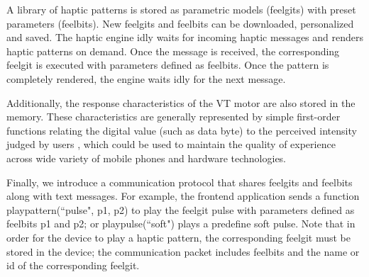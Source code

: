 A library of haptic patterns is stored as parametric models (feelgits) with preset parameters (feelbits). New feelgits and feelbits can be downloaded, personalized and saved. The haptic engine idly waits for incoming haptic messages and renders haptic patterns on demand. Once the message is received, the corresponding feelgit is executed with parameters defined as feelbits. Once the pattern is completely rendered, the engine waits idly for the next message.

Additionally, the response characteristics of the VT motor are also stored in the memory. These characteristics are generally represented by simple first-order functions relating the digital value (such as data byte) to the perceived intensity judged by users \cite{Jones2008tactors}, which could be used to maintain the quality of experience across wide variety of mobile phones and hardware technologies.

Finally, we introduce a communication protocol that shares feelgits and feelbits along with text messages. For example, the frontend application sends a function playpattern(``pulse", p1, p2) to play the feelgit pulse with parameters defined as feelbits p1 and p2; or playpulse(``soft") plays a predefine soft pulse. Note that in order for the device to play a haptic pattern, the corresponding feelgit must be stored in the device; the communication packet includes feelbits and the name or id of the corresponding feelgit.




%


